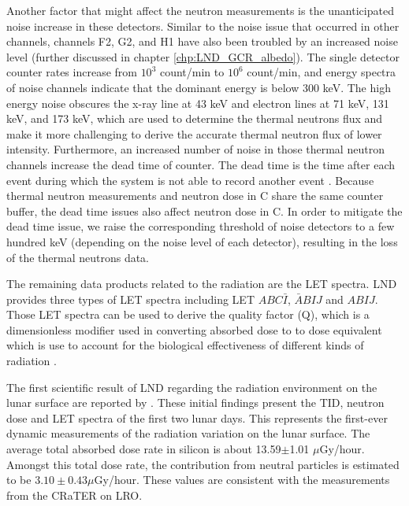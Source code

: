 Another factor that might affect the neutron measurements is the unanticipated noise increase in these detectors. Similar to the noise issue that occurred in other channels, channels F2, G2, and H1 have also been troubled by an increased noise level (further discussed in chapter \ref{chp:LND_GCR_albedo}). The single detector counter rates increase from $10^3$ count/min to $10^6$ count/min, and energy spectra of noise channels indicate that the dominant energy is below 300 keV.
The high energy noise obscures the x-ray line at 43 keV and electron lines at 71 keV, 131 keV, and 173 keV, which are used to determine the thermal neutrons flux and make it more challenging to derive the accurate thermal neutron flux of lower intensity.
Furthermore, an increased number of noise in those thermal neutron channels increase the dead time of counter. The dead time is the time after each event during which the system is not able to record another event \citep{leo1994techniques}. Because thermal neutron measurements and neutron dose in C share the same counter buffer, the dead time issues also affect neutron dose in C. In order to mitigate the dead time issue, we raise the corresponding threshold of noise detectors to a few hundred keV (depending on the noise level of each detector), resulting in the loss of the thermal neutrons data.


The remaining data products related to the radiation are the \ac{LET} spectra. \ac{LND} provides three types of \ac{LET} spectra including \ac{LET} $ABC\bar{I}$, $\bar{A}BIJ$ and $ABIJ$. Those \ac{LET} spectra can be used to derive the quality factor (Q), which is a dimensionless modifier used in converting absorbed dose to to dose equivalent which is use to account for the biological effectiveness of different kinds of radiation \citep{Kerr1988Qualityfacgtor}.


The first scientific result of \ac{LND} regarding the radiation environment on the lunar surface are reported by \citet{Zhang2020SciAdv}. These initial findings present the \ac{TID}, neutron dose and \ac{LET} spectra of the first two lunar days. This represents the first-ever dynamic measurements of the radiation variation on the lunar surface. The average total absorbed dose rate in silicon is about 13.59$\pm$1.01 $\mu$Gy/hour. Amongst this total dose rate, the contribution from neutral particles is estimated to be $3.10 \pm 0.43 \mu$Gy/hour. These values are consistent with the measurements from the \ac{CRaTER} on \ac{LRO}.



